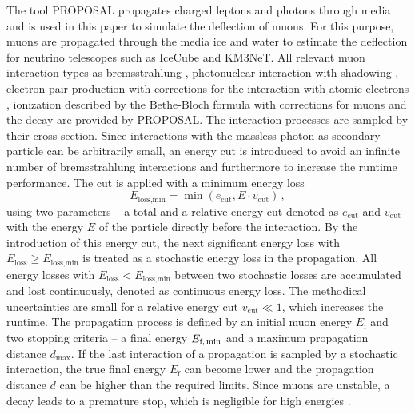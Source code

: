 The tool PROPOSAL \cite{koehne2013proposal, dunsch_2018_proposal_improvements} propagates charged leptons and photons through media and is 
used in this paper to simulate the deflection of muons. For this purpose, 
muons are propagated through the media ice and water 
to estimate the deflection for neutrino telescopes such as IceCube and KM3NeT. All relevant muon interaction types 
as bremsstrahlung \cite{KKP_1995, Bremsstrahlung_KKP}, photonuclear interaction \cite{Abramowicz_1997} with 
shadowing \cite{ButkevichMikheyev_2002}, electron pair production \cite{epair_kokoulin_petrukhin} with corrections for the 
interaction with atomic electrons \cite{epair_kelner}, 
ionization described by the Bethe-Bloch formula with corrections for muons \cite{Rossi} 
and the decay are provided by PROPOSAL. The interaction processes are sampled by their cross section.
Since interactions 
with the massless photon as secondary particle can be arbitrarily small, an energy cut is introduced to avoid an infinite number of bremsstrahlung interactions 
and furthermore to increase the runtime performance. 
The cut is applied with a minimum energy loss
\begin{equation}
    E_{\text{loss,min}} = \min{(e_{\mathrm{cut}}, E \cdot v_{\mathrm{cut}})}\,,
\end{equation}
using two parameters -- a total and a relative energy cut denoted as 
$e_{\mathrm{cut}}$ and $v_{\mathrm{cut}}$ with the energy $E$ of the particle 
directly before the interaction. 
By the introduction of 
this energy cut, the next significant energy loss with 
$E_{\mathrm{loss}} \geq E_{\text{loss,min}}$ 
is treated as a stochastic energy loss in the propagation. 
All energy losses with $E_{\mathrm{loss}} < E_{\text{loss,min}}$ between 
two stochastic losses are accumulated and lost continuously, denoted 
as continuous energy loss.
The methodical uncertainties are small 
for a relative energy cut $v_{\mathrm{cut}}\ll 1$, which increases the runtime.
The 
propagation process is defined by an initial muon energy $E_{\text{i}}$ and 
two stopping criteria -- a final energy $E_{\text{f,\,min}}$ and a 
maximum propagation distance $d_{\text{max}}$. If the last interaction of 
a propagation is sampled by a stochastic interaction, the true final energy 
$E_{\text{f}}$ can become lower and the 
propagation distance $d$ can be higher than the required limits. 
Since muons are unstable, a decay leads to a premature 
stop, which is negligible for high energies \cite{phd_soedingrekso}.

